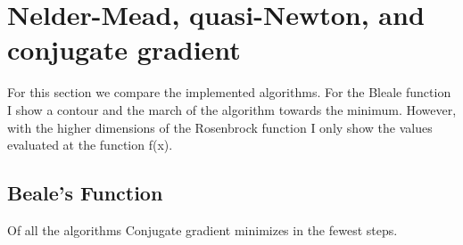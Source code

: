 \documentclass[7pt]{article}
\begin{document}
	
	\section{Nelder-Mead, quasi-Newton, and conjugate gradient}
	For this section we compare the implemented algorithms. For the Bleale function I show a contour and the march of the algorithm towards the minimum. However, with the higher dimensions of the Rosenbrock function I only show the values evaluated at the function f(x). 
		\subsection{Beale's Function}
		Of all the algorithms Conjugate gradient minimizes in the fewest steps. \\
			\noindent%
			\begin{minipage}{\linewidth}%
			\end{minipage}
		\noindent%
		\begin{minipage}{\linewidth}%
		\end{minipage}
\end{document}
